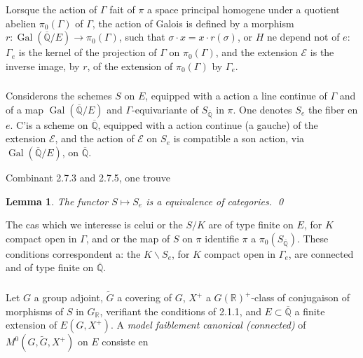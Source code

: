 \documentclass[12pt,a4paper]{article}
\theoremstyle{plain}
\newtheorem{lemma}[theorem]{Lemma}
\theoremstyle{definition}
\theoremstyle{remark}
\DeclareMathOperator{\Gal}{Gal}
\newcommand{\QQ}{\mathbb{Q}}
\newcommand{\RR}{\mathbb{R}}
\begin{document}
\subsubsection{}

Lorsque the action of $\Gamma$ fait of $\pi$ a space principal homogene under a quotient abelien $\pi_0(\Gamma)$ of $\Gamma$, the action of Galois is defined by a morphism $r: \Gal(\overline{\QQ}/E) \to \pi_0(\Gamma)$, such that $\sigma \cdot x = x \cdot r(\sigma)$, or $H$ ne depend not of $e$: $\Gamma_e$ is the kernel of the projection of $\Gamma$ on $\pi_0(\Gamma)$, and the extension $\mathscr{E}$ is the inverse image, by $r$, of the extension of $\pi_0(\Gamma)$ by $\Gamma_e$.

\subsubsection{}

Considerons the schemes $S$ on $E$, equipped with a action a line continue of $\Gamma$ and of a map $\Gal(\overline{\QQ}/E)$ and $\Gamma$-equivariante of $S_{\overline{\QQ}}$ in $\pi$. One denotes $S_e$ the fiber en $e$. C'is a scheme on $\overline{\QQ}$, equipped with a action continue (a gauche) of the extension $\mathscr{E}$, and the action of $\mathscr{E}$ on $S_e$ is compatible a son action, via $\Gal(\overline{\QQ}/E)$, on $\overline{\QQ}$.

Combinant 2.7.3 and 2.7.5, one trouve

\begin{lemma}
The functor $S \mapsto S_e$ is a equivalence of categories.
\qed
\end{lemma}

The cas which we interesse is celui or the $S/K$ are of type finite on $E$, for $K$ compact open in $\Gamma$, and or the map of $S$ on $\pi$ identifie $\pi$ a $\pi_0(S_{\overline{\QQ}})$. These conditions correspondent a: the $K\backslash S_e$, for $K$ compact open in $\Gamma_e$, are connected and of type finite on $\overline{\QQ}$.

\subsubsection{}

Let $G$ a group adjoint, $\tilde{G}$ a covering of $G$, $X^+$ a $G(\RR)^+$-class of conjugaison of morphisms of $S$ in $G_{\RR}$, verifiant the conditions of 2.1.1, and $E \subset \overline{\QQ}$ a finite extension of $E(G,X^+)$. A \textit{model faiblement canonical (connected)} of $M^0(G,\tilde{G},X^+)$ on $E$ consiste en
\end{document}
